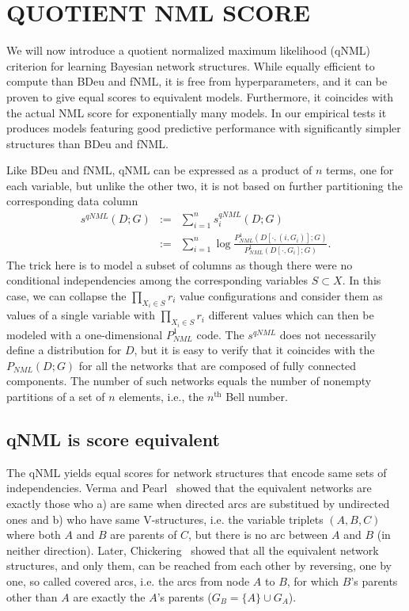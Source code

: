 \documentclass[letterpaper]{article}
\begin{document}
\section{QUOTIENT NML SCORE}

We will now introduce a quotient normalized maximum likelihood (qNML)
criterion for learning Bayesian network structures.  While equally
efficient to compute than BDeu and fNML, it is free from
hyperparameters, and it can be proven to give equal scores to
equivalent models. Furthermore, it coincides with the actual NML score
for exponentially many models. In our empirical tests it produces
models featuring good predictive performance with significantly
simpler structures than BDeu and fNML.

Like BDeu and fNML, qNML can be expressed as a product of $n$ terms,
one for each variable, but unlike the other two, it is not based on
further partitioning the corresponding data column
\begin{eqnarray}
s^{qNML}(D;G) & := & \sum_{i=1}^n s^{qNML}_i(D;G)\\
& := & \sum_{i=1}^n \log \frac{P^1_{NML}(D[\cdot,(i,G_i)];G)}
                             {P^1_{NML}(D[\cdot,G_i];G)}.\nonumber
\end{eqnarray}
The trick here is to model a subset of columns as though there were no
conditional independencies among the corresponding variables $S
\subset X$.  In this case, we can collapse the $\prod_{X_i\in S} r_i$
value configurations and consider them as values of a single variable
with $\prod_{X_i\in S} r_i$ different values which can then be modeled
with a one-dimensional $P^1_{NML}$ code.  The $s^{qNML}$ does not
necessarily define a distribution for $D$, but it is easy to verify
that it coincides with the $P_{NML}(D;G)$ for all the networks that
are composed of fully connected components.  The number of such
networks equals the number of nonempty partitions of a set of $n$
elements, i.e., the $n^\text{th}$ Bell number.

\subsection {qNML is score equivalent}

The qNML yields equal scores for network structures that encode same
sets of independencies. Verma and Pearl~\cite{Verm90} showed that the
equivalent networks are exactly those who a) are same when directed
arcs are substitued by undirected ones and b) who have same
V-structures, i.e.  the variable triplets $(A,B,C)$ where both $A$ and
$B$ are parents of $C$, but there is no arc between $A$ and $B$ (in
neither direction).  Later, Chickering~\cite{Chick95} showed that all
the equivalent network structures, and only them, can be reached from
each other by reversing, one by one, so called covered arcs, i.e. the
arcs from node $A$ to $B$, for which $B$'s parents other than $A$ are
exactly the $A$'s parents ($G_B=\{A\}\cup G_A$).
\end{document}
